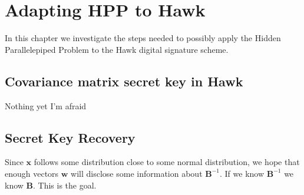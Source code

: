 \chapter{Adapting HPP to Hawk}
In this chapter we investigate the steps needed to possibly apply the Hidden Parallelepiped Problem to the Hawk digital signature scheme.
\section{Covariance matrix secret key in Hawk}
Nothing yet I'm afraid
\section{Secret Key Recovery}
Since $\mathbf{x}$ follows some distribution close to some normal distribution, we hope that enough vectors $\mathbf{w}$ will disclose some information about $\mathbf{B}^{-1}$.
If we know $\mathbf{B}^{-1}$ we know $\mathbf{B}$. This is the goal.
